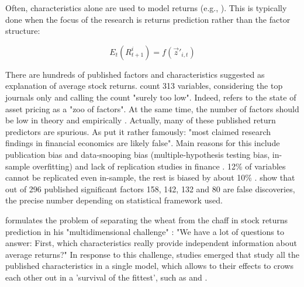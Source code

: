 			Often, characteristics alone are used to model returns (e.g., \cite{gu2020empirical, bryzgalova2019forest, tobek2020does}). This is typically done when the focus of the research is returns prediction rather than the factor structure:
			
			\begin{equation}
				E_t(R^i_{t+1}) = f(\vec{z}'_{i,t})
			\end{equation}
			
			
			There are hundreds of published factors and characteristics suggested as explanation of average stock returns. \cite{harvey2016and} count 313 variables, considering the top journals only and calling the count "surely too low". Indeed, \cite{cochrane2011presidential} refers to the state of asset pricing as a "zoo of factors". At the same time, the number of factors should be low in theory \citep{cochrane2011presidential} and empirically \citep{ahn2012determining}. Actually, many of these published return predictors are spurious. As \cite[p.~5]{harvey2016and} put it rather famously: "most claimed research findings in financial economics are likely false". Main reasons for this include publication bias and data-snooping bias (multiple-hypothesis testing bias, in-sample overfitting) and lack of replication studies in finance \citep{harvey2016and, mclean2016does}. 12\% of variables cannot be replicated even in-sample, the rest is biased by about 10\% \citep{mclean2016does}. \cite{harvey2016and} show that out of 296 published significant factors 158, 142, 132 and 80 are false discoveries, the precise number depending on statistical framework used.
			
			\citeauthor{cochrane2011presidential} formulates the problem of separating the wheat from the chaff in stock returns prediction in his "multidimensional challenge" \citep[p.~1060]{cochrane2011presidential}: "We have a lot of questions to answer: First, which characteristics really provide independent information about average returns?" In response to this challenge, studies emerged that study all the published characteristics in a single model, which allows to their effects to crows each other out in a 'survival of the fittest', such as \cite{gu2020empirical} and \cite{tobek2020does}. 
		
